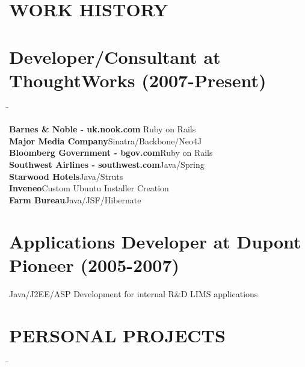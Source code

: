 \documentclass{res}
\begin{document}
 


\address{udit.manektala.com \\  uditmanektala@gmail.com \\  (515) 770-2500}        
                                  
\begin{resume}

\section{WORK HISTORY}       
\section {Developer/Consultant at ThoughtWorks (2007-Present)}\vspace{-0.01in}   
   \begin{tabbing}
   \hspace{3.3in}\= \kill %

{\bf Barnes \& Noble - uk.nook.com} \>Ruby on Rails \\


{\bf Major Media Company}\>Sinatra/Backbone/Neo4J \\

{\bf Bloomberg Government - bgov.com}\>Ruby on Rails \\

{\bf Southwest Airlines - southwest.com}\>Java/Spring \\

{\bf Starwood Hotels}\>Java/Struts\\

{\bf Inveneo}\>Custom Ubuntu Installer Creation\\

{\bf Farm Bureau}\>Java/JSF/Hibernate \\
 
\section {Applications Developer at Dupont Pioneer (2005-2007)}
Java/J2EE/ASP Development for internal R\&D LIMS applications
\end{tabbing}
\section{PERSONAL PROJECTS}  \vspace{-0.01in}   
   \begin{tabbing}
   \hspace{3.3in}\= \kill %


\end{tabbing}
\end{resume}
\end{document}

